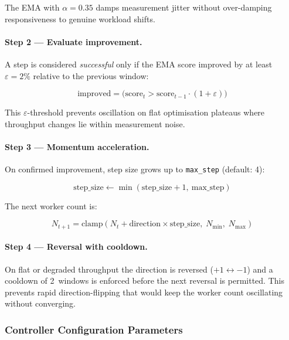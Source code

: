 \documentclass[12pt,a4paper]{article}
\begin{document}
The EMA with $\alpha = 0.35$ damps measurement jitter without over-damping
responsiveness to genuine workload shifts.

\paragraph{Step 2 --- Evaluate improvement.}

A step is considered \emph{successful} only if the EMA score improved by
at least $\varepsilon = 2\%$ relative to the previous window:

\begin{equation}
  \text{improved} =
    \bigl(\text{score}_t > \text{score}_{t-1} \cdot (1 + \varepsilon)\bigr)
  \label{eq:epsilon}
\end{equation}

This $\varepsilon$-threshold prevents oscillation on flat optimisation
plateaus where throughput changes lie within measurement noise.

\paragraph{Step 3 --- Momentum acceleration.}

On confirmed improvement, step size grows up to \texttt{max\_step}
(default: 4):

\begin{equation}
  \text{step\_size} \leftarrow
    \min(\text{step\_size} + 1,\ \text{max\_step})
\end{equation}

The next worker count is:

\begin{equation}
  N_{t+1} = \text{clamp}\!\left(
    N_t + \text{direction} \times \text{step\_size},\;
    N_{\min},\; N_{\max}
  \right)
\end{equation}

\paragraph{Step 4 --- Reversal with cooldown.}

On flat or degraded throughput the direction is reversed
($+1 \leftrightarrow -1$) and a cooldown of 2~windows is enforced before
the next reversal is permitted.
This prevents rapid direction-flipping that would keep the worker count
oscillating without converging.

\subsubsection{Controller Configuration Parameters}
\end{document}
